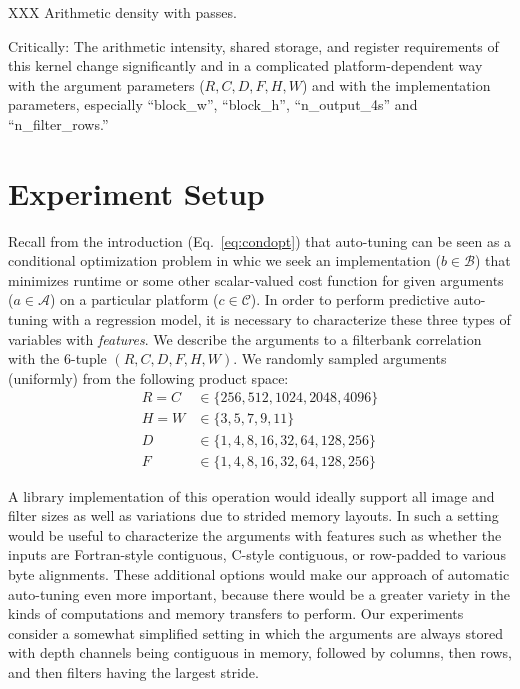 \documentclass{sig-alternate}
\begin{document}
XXX
Arithmetic density with passes.

Critically:
The arithmetic intensity, shared storage, and register requirements
of this kernel change significantly and in a complicated platform-dependent way
with the argument parameters ($R, C, D, F, H, W$) and with the implementation parameters,
especially ``block\_w'', ``block\_h'', ``n\_output\_4s'' and ``n\_filter\_rows.''


\section{Experiment Setup}

Recall from the introduction (Eq.~\ref{eq:condopt}) that auto-tuning can be seen
as a conditional optimization problem in whic we seek an implementation ($b \in \mathcal{B}$) that minimizes runtime or some other scalar-valued cost function
for given arguments ($a \in \mathcal{A}$) on a particular platform ($c \in \mathcal{C}$).
In order to perform predictive auto-tuning with a regression model,
it is necessary to characterize these
three types of variables with {\em features}.
We describe the arguments to a filterbank correlation with the 6-tuple
$(R, C, D, F, H, W)$.
We randomly sampled arguments (uniformly) from the following product space:
\begin{align*}
R = C & \in \{ 256, 512, 1024, 2048, 4096 \} \\
H = W & \in \{ 3, 5, 7, 9, 11 \} \\
D &  \in \{1, 4, 8, 16, 32, 64, 128, 256 \} \\
F &  \in \{1, 4, 8, 16, 32, 64, 128, 256 \}
\end{align*}

A library implementation of this operation would ideally support all image and
filter sizes as well as variations due
to strided memory layouts. In such a setting would be useful to characterize
the arguments with
features such as whether the inputs are Fortran-style contiguous, C-style contiguous, or row-padded to various byte alignments.
These additional options would make our
approach of automatic auto-tuning even more important, because there would be
a greater variety in the kinds of computations and memory transfers to
perform.
Our experiments consider a somewhat simplified setting in which the arguments are always stored
with depth channels being contiguous in memory, followed by columns, then rows, and then filters having the largest stride.
\end{document}
